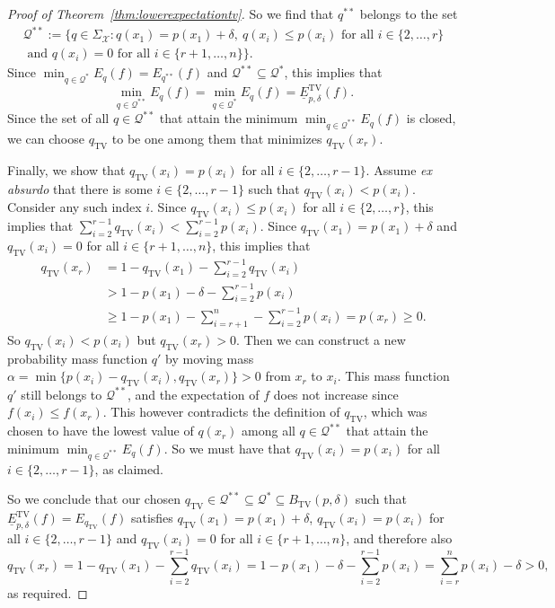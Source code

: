 \documentclass[10pt,a4paper]{amsart}
\begin{document}
\begin{proof}[Proof of Theorem~\ref{thm:lowerexpectationtv}]
So we find that $q^{**}$ belongs to the set
\begin{multline*}
\mathcal{Q}^{**}:=\{q\in\Sigma_\mathcal{X}: q(x_1)=p(x_1)+\delta,~q(x_i)\leq p(x_i)\text{ for all }i\in\{2,\ldots,r\}\\\text{ and }q(x_i)=0\text{ for all }i\in\{r+1,\ldots,n\}\}.
\end{multline*}
Since $\min_{q\in\mathcal{Q}^*} E_q(f)=E_{q^{**}}(f)$ and $\mathcal{Q}^{**}\subseteq\mathcal{Q}^*$, this implies that
\begin{equation*}
\min_{q\in\mathcal{Q}^{**}} E_q(f)=\min_{q\in\mathcal{Q}^*}E_q(f)=\underline{E}^\mathrm{TV}_{p,\delta}(f).
\end{equation*}
Since the set of all $q\in\mathcal{Q}^{**}$ that attain the minimum $\min_{q\in\mathcal{Q}^{**}} E_q(f)$ is closed, we can choose $q_\mathrm{TV}$ to be one among them that minimizes $q_\mathrm{TV}(x_r)$.

Finally, we show that $q_\mathrm{TV}(x_i)=p(x_i)$ for all $i\in\{2,\ldots,r-1\}$. Assume \emph{ex absurdo} that there is some $i\in\{2,\ldots,r-1\}$ such that $q_\mathrm{TV}(x_i)<p(x_i)$. Consider any such index $i$. Since $q_\mathrm{TV}(x_i)\leq p(x_i)$ for all $i\in\{2,\ldots,r\}$, this implies that $\sum_{i=2}^{r-1} q_\mathrm{TV}(x_i)<\sum_{i=2}^{r-1} p(x_i)$. Since $q_\mathrm{TV}(x_1)=p(x_1)+\delta$ and $q_\mathrm{TV}(x_i)=0$ for all $i\in\{r+1,\ldots,n\}$, this implies that
\begin{align*}
q_{\mathrm{TV}}(x_r)
&=1-q_{\mathrm{TV}}(x_1)-\sum_{i=2}^{r-1} q_{\mathrm{TV}}(x_i)\\
&>1-p(x_1)-\delta-\sum_{i=2}^{r-1} p(x_i)\\
&\geq1-p(x_1)-\sum_{i=r+1}^n-\sum_{i=2}^{r-1}p(x_i)=p(x_r)\geq0.
\end{align*}
So $q_\mathrm{TV}(x_i)<p(x_i)$ but $q_{\mathrm{TV}}(x_r)>0$. Then we can construct a new probability mass function $q'$ by moving mass $\alpha=\min\{p(x_i)-q_\mathrm{TV}(x_i),q_\mathrm{TV}(x_r)\}>0$ from $x_r$ to $x_i$. This mass function $q'$ still belongs to $\mathcal{Q}^{**}$, and the expectation of $f$ does not increase since $f(x_i)\leq f(x_r)$. This however contradicts the definition of $q_\mathrm{TV}$, which was chosen to have the lowest value of $q(x_r)$ among all $q\in\mathcal{Q}^{**}$ that attain the minimum $\min_{q\in\mathcal{Q}^{**}} E_q(f)$. So we must have that $q_\mathrm{TV}(x_i)=p(x_i)$ for all $i\in\{2,\ldots,r-1\}$, as claimed.

So we conclude that our chosen $q_\mathrm{TV}\in\mathcal{Q}^{**}\subseteq\mathcal{Q}^*\subseteq B_\mathrm{TV}(p,\delta)$ such that $\underline{E}^\mathrm{TV}_{p,\delta}(f)=E_{q_\mathrm{TV}}(f)$ satisfies $q_\mathrm{TV}(x_1)=p(x_1)+\delta$, $q_\mathrm{TV}(x_i)=p(x_i)$ for all $i\in\{2,\ldots,r-1\}$ and $q_\mathrm{TV}(x_i)=0$ for all $i\in\{r+1,\ldots,n\}$, and therefore also
\begin{equation*}
q_\mathrm{TV}(x_r)=1-q_\mathrm{TV}(x_1)-\sum_{i=2}^{r-1} q_\mathrm{TV}(x_i)=1-p(x_1)-\delta-\sum_{i=2}^{r-1} p(x_i)=\sum_{i=r}^{n} p(x_i)-\delta>0,
\end{equation*}
as required.
\end{proof}
\end{document}
